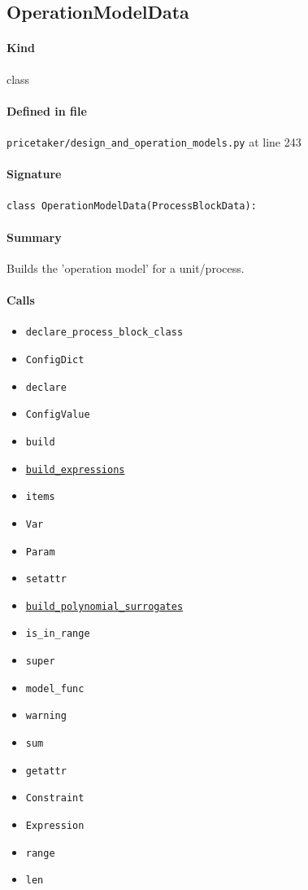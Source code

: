\documentclass[11pt]{report}
\begin{document}
\subsection{OperationModelData}
\label{def:pricetaker-design_and_operation_models.py:OperationModelData:L243}
\paragraph{Kind} class
\paragraph{Defined in file} \texttt{pricetaker/design\_and\_operation\_models.py} at line 243
\paragraph{Signature} \texttt{class OperationModelData(ProcessBlockData):}
\paragraph{Summary} Builds the 'operation model' for a unit/process.
\paragraph{Calls}
\begin{itemize}[leftmargin=*]
  \item \texttt{declare\_process\_block\_class}
  \item \texttt{ConfigDict}
  \item \texttt{declare}
  \item \texttt{ConfigValue}
  \item \texttt{build}
  \item \hyperref[def:pricetaker-design_and_operation_models.py:OperationModelData.build_expressions:L460]{\texttt{build\_expressions}}
  \item \texttt{items}
  \item \texttt{Var}
  \item \texttt{Param}
  \item \texttt{setattr}
  \item \hyperref[def:pricetaker-design_and_operation_models.py:OperationModelData.build_polynomial_surrogates:L449]{\texttt{build\_polynomial\_surrogates}}
  \item \texttt{is\_in\_range}
  \item \texttt{super}
  \item \texttt{model\_func}
  \item \texttt{warning}
  \item \texttt{sum}
  \item \texttt{getattr}
  \item \texttt{Constraint}
  \item \texttt{Expression}
  \item \texttt{range}
  \item \texttt{len}
\end{itemize}
\end{document}
